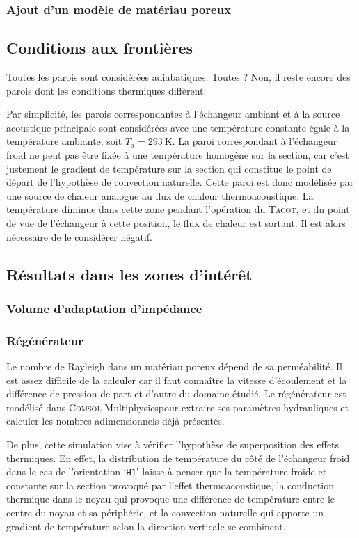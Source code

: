\subsubsection{Ajout d'un modèle de matériau poreux}


\subsection{Conditions aux frontières}
Toutes les parois sont considérées adiabatiques. Toutes ? Non, il reste encore des parois dont les conditions thermiques diffèrent. 

Par simplicité, les parois correspondantes à l'échangeur ambiant et à la source acoustique principale sont considérées avec une température constante égale à la température ambiante, soit $T_a=\qty{293}{\kelvin}$. La paroi correspondant à l'échangeur froid ne peut pas être fixée à une température homogène sur la section, car c'est justement le gradient de température sur la section qui constitue le point de départ de l'hypothèse de convection naturelle. Cette paroi est donc modélisée par une source de chaleur analogue au flux de chaleur thermoacoustique. La température diminue dans cette zone pendant l'opération du \textsc{Tacot}, et du point de vue de l'échangeur à cette position, le flux de chaleur est sortant. Il est alors nécessaire de le considérer négatif.

\subsection{Résultats dans les zones d'intérêt}
\subsubsection{Volume d'adaptation d'impédance}

\subsubsection{Régénérateur}
Le nombre de Rayleigh dans un matériau poreux dépend de sa perméabilité. Il est assez difficile de la calculer car il faut connaître la vitesse d'écoulement et la différence de pression de part et d'autre du domaine étudié. Le régénérateur est modélisé dans \textsc{Comsol} Multiphysics\textss\textregistered pour extraire ses paramètres hydrauliques et calculer les nombres adimensionnels déjà présentés.

De plus, cette simulation vise à vérifier l'hypothèse de superposition des effets thermiques. En effet, la distribution de température du côté de l'échangeur froid dans le cas de l'orientation `\texttt{H1}' laisse à penser que la température froide et constante sur la section provoqué par l'effet thermoacoustique, la conduction thermique dans le noyau qui provoque une différence de température entre le centre du noyau et sa périphérie, et la convection naturelle qui apporte un gradient de température selon la direction verticale se combinent.

